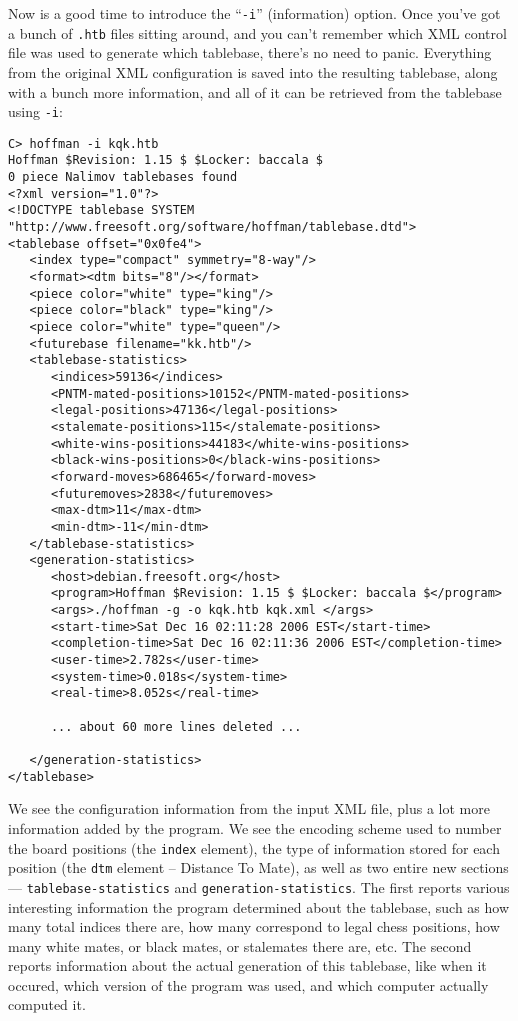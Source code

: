 \documentclass[11pt]{article}
\begin{document}
Now is a good time to introduce the ``{\tt -i}'' (information) option.
Once you've got a bunch of {\tt .htb} files sitting around, and you
can't remember which XML control file was used to generate which
tablebase, there's no need to panic.  Everything from the original XML
configuration is saved into the resulting tablebase, along with a
bunch more information, and all of it can be retrieved from the
tablebase using {\tt -i}:

{\small\begin{verbatim}
C> hoffman -i kqk.htb
Hoffman $Revision: 1.15 $ $Locker: baccala $
0 piece Nalimov tablebases found
<?xml version="1.0"?>
<!DOCTYPE tablebase SYSTEM "http://www.freesoft.org/software/hoffman/tablebase.dtd">
<tablebase offset="0x0fe4">
   <index type="compact" symmetry="8-way"/>
   <format><dtm bits="8"/></format>
   <piece color="white" type="king"/>
   <piece color="black" type="king"/>
   <piece color="white" type="queen"/>
   <futurebase filename="kk.htb"/>
   <tablebase-statistics>
      <indices>59136</indices>
      <PNTM-mated-positions>10152</PNTM-mated-positions>
      <legal-positions>47136</legal-positions>
      <stalemate-positions>115</stalemate-positions>
      <white-wins-positions>44183</white-wins-positions>
      <black-wins-positions>0</black-wins-positions>
      <forward-moves>686465</forward-moves>
      <futuremoves>2838</futuremoves>
      <max-dtm>11</max-dtm>
      <min-dtm>-11</min-dtm>
   </tablebase-statistics>
   <generation-statistics>
      <host>debian.freesoft.org</host>
      <program>Hoffman $Revision: 1.15 $ $Locker: baccala $</program>
      <args>./hoffman -g -o kqk.htb kqk.xml </args>
      <start-time>Sat Dec 16 02:11:28 2006 EST</start-time>
      <completion-time>Sat Dec 16 02:11:36 2006 EST</completion-time>
      <user-time>2.782s</user-time>
      <system-time>0.018s</system-time>
      <real-time>8.052s</real-time>

      ... about 60 more lines deleted ...

   </generation-statistics>
</tablebase>
\end{verbatim}}

We see the configuration information from the input XML file, plus a
 lot more information added by the program.  We see the encoding
 scheme used to number the board positions (the {\tt index} element),
 the type of information stored for each position (the {\tt dtm}
 element -- Distance To Mate), as well as two entire new sections ---
 {\tt tablebase-statistics} and {\tt generation-statistics}.  The
 first reports various interesting information the program determined
 about the tablebase, such as how many total indices there are, how
 many correspond to legal chess positions, how many white mates, or
 black mates, or stalemates there are, etc.  The second reports
 information about the actual generation of this tablebase, like when
 it occured, which version of the program was used, and which computer
 actually computed it.
\end{document}
